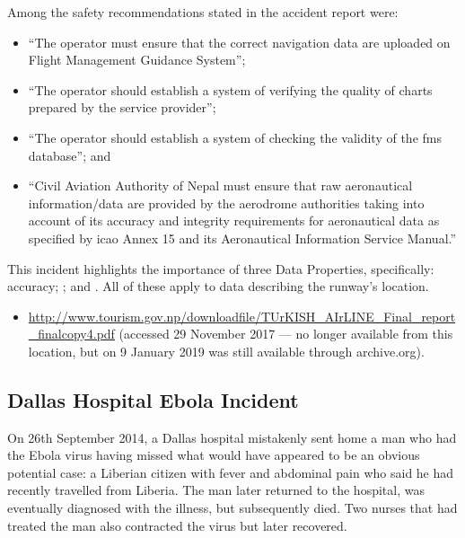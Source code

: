 Among the safety recommendations stated in the accident report were:
\begin{itemize}
  \item ``The operator must ensure that the correct navigation data are uploaded on Flight Management Guidance System''; 
  \item ``The operator should establish a system of verifying the quality of charts prepared by the service provider''; 
  \item ``The operator should establish a system of checking the validity of the \gls{fms} database''; and
  \item ``Civil Aviation Authority of Nepal must ensure that raw aeronautical information/data are provided by the aerodrome authorities taking into account of its accuracy and integrity requirements for aeronautical data as specified by \gls{icao} Annex 15 and its Aeronautical Information Service Manual.''
\end{itemize}

This incident highlights the importance of three Data Properties, specifically: \gls{accuracy}; ; and . All of these apply to data describing the runway's location.

\begin{samepage}
\begin{itemize}
  \item \raggedright{\href{https://web.archive.org/web/20170709044727/http://www.tourism.gov.np/downloadfile/TUrKISH_AIrLINE_Final_report_finalcopy4.pdf}{http://www.tourism.gov.np/downloadfile/TUrKISH\_AIrLINE\_Final\_report\_finalcopy4.pdf} (accessed 29 November 2017 --- no longer available from this location, but on 9 January 2019 was still available through archive.org).}
\end{itemize}
\end{samepage}


\subsection{Dallas Hospital Ebola Incident} \label{bkm:incacc:dallasebola}
On 26th September 2014, a Dallas hospital mistakenly sent home a man who had the Ebola virus having missed what would have appeared to be an obvious potential case: a Liberian citizen with fever and abdominal pain who said he had recently travelled from Liberia. The man later returned to the hospital, was eventually diagnosed with the illness, but subsequently died. Two nurses that had treated the man also contracted the virus but later recovered.

